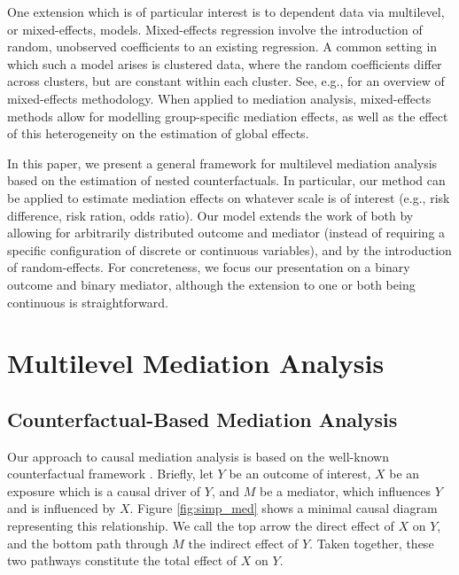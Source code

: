 \documentclass{article}
\begin{document}
One extension which is of particular interest is to dependent data via multilevel, or mixed-effects, models. Mixed-effects regression involve the introduction of random, unobserved coefficients to an existing regression. A common setting in which such a model arises is clustered data, where the random coefficients differ across clusters, but are constant within each cluster. See, e.g., \citet{Dem04} for an overview of mixed-effects methodology. When applied to mediation analysis, mixed-effects methods allow for modelling group-specific mediation effects, as well as the effect of this heterogeneity on the estimation of global effects.

In this paper, we present a general framework for multilevel mediation analysis based on the estimation of nested counterfactuals. In particular, our method can be applied to estimate mediation effects on whatever scale is of interest (e.g., risk difference, risk ration, odds ratio). Our model extends the work of \citet{Sam23} both by allowing for arbitrarily distributed outcome and mediator (instead of requiring a specific configuration of discrete or continuous variables), and by the introduction of random-effects. For concreteness, we focus our presentation on a binary outcome and binary mediator, although the extension to one or both being continuous is straightforward.




\section{Multilevel Mediation Analysis}



\subsection{Counterfactual-Based Mediation Analysis}
\label{sec:MA_defns}

Our approach to causal mediation analysis is based on the well-known counterfactual framework \citep[see, e.g.,][]{Van09,Pea12}. Briefly, let $Y$ be an outcome of interest, $X$ be an exposure which is a causal driver of $Y$, and $M$ be a mediator, which influences $Y$ and is influenced by $X$. Figure \ref{fig:simp_med} shows a minimal causal diagram representing this relationship. We call the top arrow the direct effect of $X$ on $Y$, and the bottom path through $M$ the indirect effect of $Y$. Taken together, these two pathways constitute the total effect of $X$ on $Y$.
\end{document}
